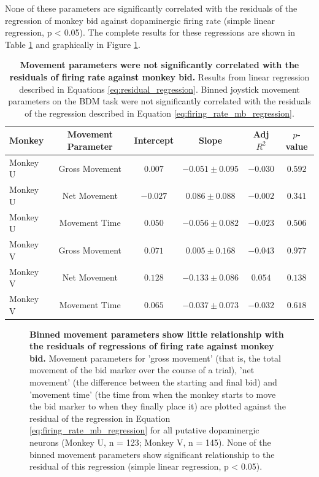 None of these parameters are significantly correlated with the residuals of the regression of monkey bid against dopaminergic firing rate (simple linear regression, p < 0.05). The complete results for these regressions are shown in Table \ref{tab:residual_regression_results} and graphically in Figure \ref{fig:residual_movement_regressions}.

\begin{table}[htbp]
\centering
\begin{tabular}{lccccc}
\hline
\textbf{Monkey} & \textbf{Movement Parameter} & \textbf{Intercept} & \textbf{Slope} & \textbf{Adj $R^2$} & \textbf{$p$-value} \\
\hline
Monkey U & Gross Movement & $0.007$ & $-0.051 \pm 0.095$ & $-0.030$ & $0.592$ \\
Monkey U & Net Movement & $-0.027$ & $0.086 \pm 0.088$ & $-0.002$ & $0.341$ \\
Monkey U & Movement Time & $0.050$ & $-0.056 \pm 0.082$ & $-0.023$ & $0.506$ \\
\hline
Monkey V & Gross Movement & $0.071$ & $0.005 \pm 0.168$ & $-0.043$ & $0.977$ \\
Monkey V & Net Movement & $0.128$ & $-0.133 \pm 0.086$ & $0.054$ & $0.138$ \\
Monkey V & Movement Time & $0.065$ & $-0.037 \pm 0.073$ & $-0.032$ & $0.618$ \\
\hline
\end{tabular}
\caption[Movement parameters were not significantly correlated with the residuals of firing rate against monkey bid.]{\textbf{Movement parameters were not significantly correlated with the residuals of firing rate against monkey bid.} Results from linear regression described in Equations \ref{eq:residual_regression}. Binned joystick movement parameters on the BDM task were not significantly correlated with the residuals of the regression described in Equation \ref{eq:firing_rate_mb_regression}.}
\label{tab:residual_regression_results}
\end{table}

\begin{figure}[htbp!] 
\centering    

\caption[Binned movement parameters show little relationship with the residuals of regressions of firing rate against monkey bid.]{\textbf{Binned movement parameters show little relationship with the residuals of regressions of firing rate against monkey bid.} Movement parameters for 'gross movement' (that is, the total movement of the bid marker over the course of a trial), 'net movement' (the difference between the starting and final bid) and 'movement time' (the time from when the monkey starts to move the bid marker to when they finally place it) are plotted against the residual of the regression in Equation \ref{eq:firing_rate_mb_regression} for all putative dopaminergic neurons (Monkey U, n = 123; Monkey V, n = 145). None of the binned movement parameters show significant relationship to the residual of this regression (simple linear regression, p < 0.05).}
\label{fig:residual_movement_regressions}
\end{figure}


